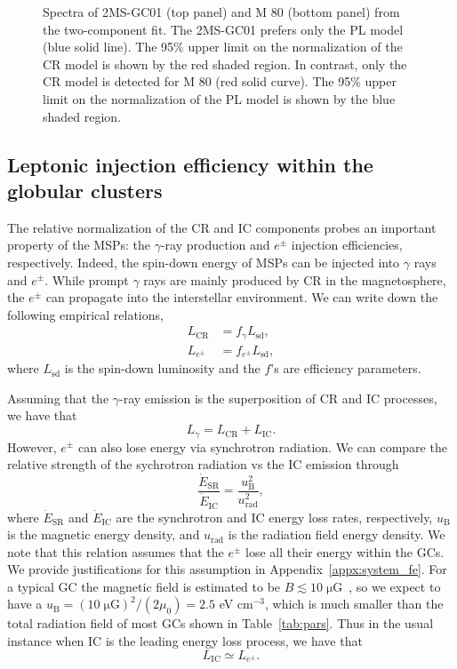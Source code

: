 \documentclass[doublespace,nopageskip]{VTthesis} %
\begin{document}
\begin{figure}
    \caption{Spectra of 2MS-GC01 (top panel) and M 80 (bottom panel) from the two-component fit. The 2MS-GC01 prefers only the {PL} model (blue solid line). The 95\% upper limit on the normalization of the CR model is shown by the red shaded region. In contrast, only the CR model is detected for M 80 (red solid curve). The 95\% upper limit on the normalization of the {PL} model is shown by the blue shaded region.}
    \label{fig:global_spectra_ul}
\end{figure}

\subsection{Leptonic injection efficiency within the globular clusters}\label{spectra_fe}

The relative normalization of the CR and IC components probes an important property of the MSPs: the $\gamma$-ray production and $e^\pm$ injection efficiencies, respectively. Indeed, the spin-down energy of MSPs can be injected into $\gamma$ rays and $e^\pm$. While prompt $\gamma$ rays are mainly produced by CR in the magnetosphere, the $e^\pm$ can propagate into the interstellar environment. We can write down the following empirical relations,
\begin{align}
    L_\mathrm{CR} &= f_\gamma L_\mathrm{sd},\\
    L_{e^\pm} &= f_{e^\pm} L_\mathrm{sd},
\end{align}
where $L_\mathrm{sd}$ is the spin-down luminosity and the $f$'s are efficiency parameters. 

Assuming that the $\gamma$-ray emission is the superposition of CR and IC processes, we have that
\begin{equation}
    L_\gamma = L_\mathrm{CR} + L_\mathrm{IC}.
\end{equation}
However, $e^\pm$ can also lose energy via synchrotron radiation. We can compare the relative strength of the sychrotron radiation vs the IC emission through
\begin{equation}
    \frac{\dot{E}_\mathrm{SR}}{\dot{E}_\mathrm{IC}} = \frac{u_\mathrm{B}^2}{u_\mathrm{rad}^2},
\end{equation}
where $\dot{E}_\mathrm{SR}$ and $\dot{E}_\mathrm{IC}$ are the synchrotron and IC energy loss rates, respectively, $u_\mathrm{B}$ is the magnetic energy density, and $u_\mathrm{rad}$ is the radiation field energy density. We note that this relation assumes that the $e^\pm$ lose all their energy within the GCs. We provide justifications for this assumption in Appendix~\ref{appx:system_fe}. For a typical GC the magnetic field is estimated to be $B\lesssim \mathrm{10\;\mu G}$~\citep{2007MNRAS.377..920B}, so we expect to have a $u_\mathrm{B} = {\mathrm{(10\;\mu G)}^2}/{(2\mu_0)} = 2.5$ eV cm$^{-3}$, which is much smaller than the total radiation field of most GCs shown in Table~\ref{tab:pars}. Thus in the usual instance when IC is the leading energy loss process, we have that
\begin{equation}
    L_\mathrm{IC} \simeq L_{e^\pm}.
\end{equation}
\end{document}
